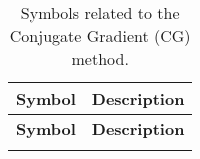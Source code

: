 \begin{longtable}{c p{10cm}}
    \caption{Symbols related to the Conjugate Gradient (CG) method.}\label{tab:cg_symbols}                                                         \\
    \hline
    \textbf{Symbol}                  & \textbf{Description}                                                                                        \\
    \hline
    \endfirsthead

    \hline
    \textbf{Symbol}                  & \textbf{Description}                                                                                        \\
    \hline
    \endhead

    \hline
    \endfoot

    \hline
    \endlastfoot


\end{longtable}
